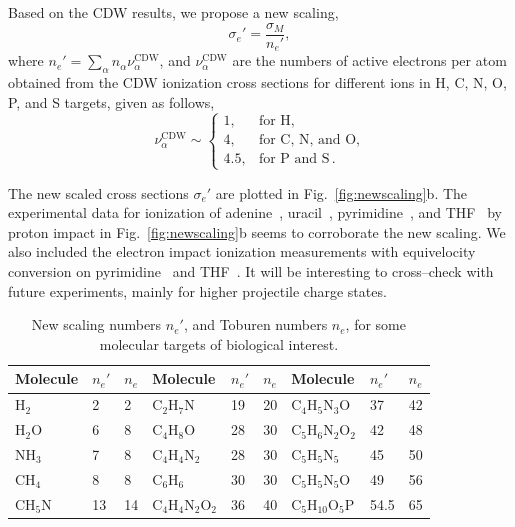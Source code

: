 \documentclass[10pt,showpacs,showkeys,twocolumn]{revtex4}
\begin{document}
Based on the CDW results, we propose a new scaling,
\begin{equation}
\sigma_{e}'=\frac{\sigma_M}{n_e'},
\label{32} 
\end{equation}
where $n_e'=\sum_{\alpha}n_{\alpha}\nu_{\alpha}^{\text{CDW}}$, and 
$\nu_{\alpha}^{\text{CDW}}$ are the numbers of active electrons
per atom obtained from the CDW ionization cross sections for 
different ions in H, C, N, O, P, and S targets, given as follows,
\begin{equation}
\nu_{\alpha }^{\text{CDW}} \sim\left\{ 
\begin{array}{ll}
1, & \text{for H,} \\
4, & \text{for C, N, and O,} \\ 
4.5, & \text{for P and S}\,.
\end{array}
\right. 
\label{eq:scalingCDW}
\end{equation}

The new scaled cross sections $\sigma_{e}'$ are plotted in 
Fig.~\ref{fig:newscaling}b. The experimental data for ionization of 
adenine~\cite{iriki2011}, uracil~\cite{itoh2013}, 
pyrimidine~\cite{wolff2014}, and THF~\cite{wang2016} by proton impact in
Fig.~\ref{fig:newscaling}b seems to corroborate the new scaling. 
We also included the electron impact ionization measurements with 
equivelocity conversion on pyrimidine~\cite{bug2017} and 
THF~\cite{bug2017,wolf2019,fuss2009}. 
It will be interesting to cross--check with future experiments, mainly 
for higher projectile charge states. 

\begin{table}[t]
\begin{center}
\begin{tabular}{|p{}p{}p{}|
p{}p{}p{}|
p{}p{}p{}|}
\hline
 Molecule & $n_e'$ & $n_e$ & Molecule          & $n_e'$ & $n_e$ & Molecule             & $n_e'$ & $n_e$ \\
\hline
 H$_2$    & 2 & 2   & C$_2$H$_7$N         & 19 & 20 & C$_4$H$_5$N$_3$O     & 37 & 42 \\
 H$_2$O   & 6 & 8   & C$_4$H$_8$O         & 28 & 30 & C$_5$H$_6$N$_2$O$_2$ & 42 & 48 \\
 NH$_3$   & 7 & 8   & C$_4$H$_4$N$_2$     & 28 & 30 & C$_5$H$_5$N$_5$      & 45 & 50 \\
 CH$_4$   & 8 & 8   & C$_6$H$_6$          & 30 & 30 & C$_5$H$_5$N$_5$O     & 49 & 56 \\
 CH$_5$N  & 13 & 14 & C$_4$H$_4$N$_2$O$_2$& 36 & 40 & C$_5$H$_{10}$O$_5$P  & 54.5 & 65 \\
 \hline
\end{tabular}
\caption{New scaling numbers $n_e'$, and Toburen numbers $n_e$,
for some molecular targets of biological interest.}
\label{nn}
\end{center}
\end{table}
\end{document}
